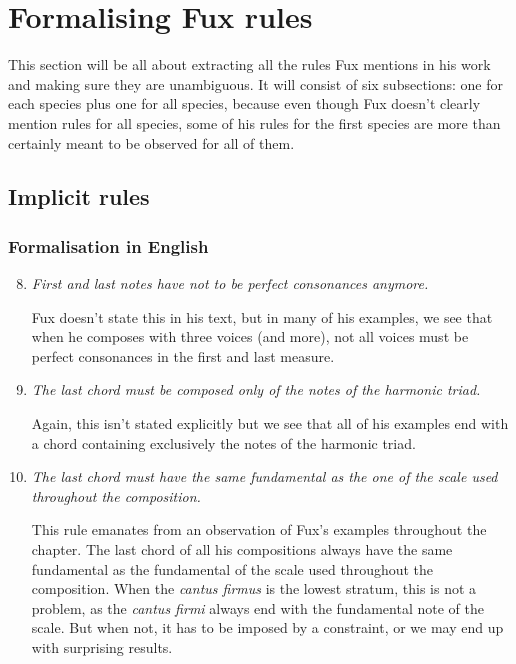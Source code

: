 \chapter{Formalising Fux rules}
This section will be all about extracting all the rules Fux mentions in his work and making sure they are unambiguous.
It will consist of six subsections: one for each species plus one for all species, because even though Fux doesn't clearly mention rules for all species, some of his rules for the first species are more than certainly meant to be observed for all of them. 
\section{Implicit rules}
\subsection{Formalisation in English} \label{sec:generalenglish}
\begin{enumerate}[wide, label=\bfseries G\arabic*]
    \setcounter{enumi}{7} %
    \item \textit{First and last notes have not to be perfect consonances anymore.} \label{rule:last-chord-not-perfect-anymore}    
    
    Fux doesn't state this in his text, but in many of his examples, we see that when he composes with three voices (and more), not all voices must be perfect consonances in the first and last measure.

    \item \textit{The last chord must be composed only of the notes of the harmonic triad.} \label{rule:last-chord-h-triad}

    Again, this isn't stated explicitly but we see that all of his examples end with a chord containing exclusively the notes of the harmonic triad.
    
    \item \textit{The last chord must have the same fundamental as the one of the scale used throughout the composition.}\label{rule:same-fundamental}

    This rule emanates from an observation of Fux's examples throughout the chapter. The last chord of all his compositions always have the same fundamental as the fundamental of the scale used throughout the composition.
    When the \textit{cantus firmus} is the lowest stratum, this is not a problem, as the \textit{cantus firmi} always end with the fundamental note of the scale. But when not, it has to be imposed by a constraint, or we may end up with surprising results.
\end{enumerate}

